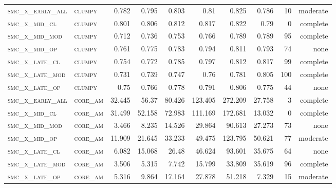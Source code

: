 \begin{landscape}
\begin{center}
\begin{footnotesize}
\begin{longtable}{llrrrrr|rrr}
\textsc{smc\_x\_early\_all} & \textsc{clumpy    }   & 0.782      & 0.795      & 0.803      & 0.81       & 0.825      & 0.786      & 10    & moderate   \\
\textsc{smc\_x\_mid\_cl   } & \textsc{clumpy    }   & 0.801      & 0.806      & 0.812      & 0.817      & 0.822      & 0.79       & 0     & complete   \\
\textsc{smc\_x\_mid\_mod  } & \textsc{clumpy    }   & 0.712      & 0.736      & 0.753      & 0.766      & 0.789      & 0.789      & 95    & complete   \\
\textsc{smc\_x\_mid\_op   } & \textsc{clumpy    }   & 0.761      & 0.775      & 0.783      & 0.794      & 0.811      & 0.793      & 74    & none   \\
\textsc{smc\_x\_late\_cl  } & \textsc{clumpy    }   & 0.754      & 0.772      & 0.785      & 0.797      & 0.812      & 0.817      & 99    & complete   \\
\textsc{smc\_x\_late\_mod } & \textsc{clumpy    }   & 0.731      & 0.739      & 0.747      & 0.76       & 0.781      & 0.805      & 100   & complete   \\
\textsc{smc\_x\_late\_op  } & \textsc{clumpy    }   & 0.75       & 0.766      & 0.778      & 0.791      & 0.806      & 0.775      & 44    & none   \\
\textsc{smc\_x\_early\_all} & \textsc{core\_am  }   & 32.445     & 56.37      & 80.426     & 123.405    & 272.209    & 27.758     & 3     & complete   \\
\textsc{smc\_x\_mid\_cl   } & \textsc{core\_am  }   & 31.499     & 52.158     & 72.983     & 111.169    & 172.681    & 13.032     & 0     & complete   \\
\textsc{smc\_x\_mid\_mod  } & \textsc{core\_am  }   & 3.466      & 8.235      & 14.526     & 29.864     & 90.613     & 27.273     & 73    & none   \\
\textsc{smc\_x\_mid\_op   } & \textsc{core\_am  }   & 11.909     & 21.645     & 33.233     & 49.475     & 123.795    & 50.621     & 77    & moderate   \\
\textsc{smc\_x\_late\_cl  } & \textsc{core\_am  }   & 6.082      & 15.068     & 26.48      & 46.624     & 93.601     & 35.675     & 64    & none   \\
\textsc{smc\_x\_late\_mod } & \textsc{core\_am  }   & 3.506      & 5.315      & 7.742      & 15.799     & 33.809     & 35.619     & 96    & complete   \\
\textsc{smc\_x\_late\_op  } & \textsc{core\_am  }   & 5.316      & 9.864      & 17.164     & 27.878     & 51.218     & 7.329      & 15    & moderate   \\

\end{longtable}
\end{footnotesize}
\end{center}
\end{landscape}
